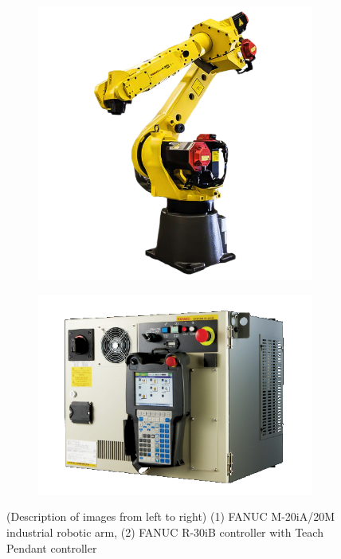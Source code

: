 \begin{figure}[h]
\centering
\begin{subfigure}{.45\textwidth}

    \includegraphics[width=1\linewidth]{img/fanuc_robot.png}

    \label{fig:a}
\end{subfigure}
\begin{subfigure}{.45\textwidth}

    \includegraphics[width=1\linewidth]{img/fanuc_controller.png}

    \label{fig:b}
\end{subfigure}

\caption{(Description of images from left to right) (1) FANUC M-20iA/20M industrial robotic arm, (2) FANUC R-30iB controller with Teach Pendant controller \cite{fanucrobotcontroller}}
\label{fig:robotcontroller}
\end{figure}



